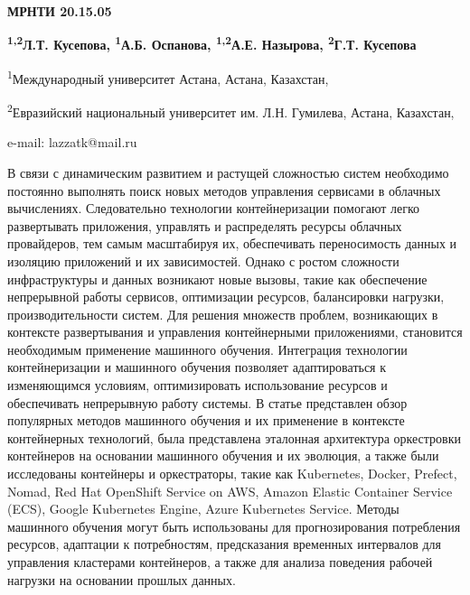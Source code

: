 \newpage
{\bfseries МРНТИ 20.15.05}


\begin{center}
{\bfseries \textsuperscript{1,2}Л.Т. Кусепова, \textsuperscript{1}А.Б.
Оспанова, \textsuperscript{1,2}А.Е. Назырова, \textsuperscript{2}Г.Т.
Кусепова}

\textsuperscript{1}Международный университет Астана, Астана, Казахстан,

\textsuperscript{2}Евразийский национальный университет им. Л.Н.
Гумилева, Астана, Казахстан,

e-mail: lazzatk@mail.ru
\end{center}

В связи с динамическим развитием и растущей сложностью систем необходимо
постоянно выполнять поиск новых методов управления сервисами в облачных
вычислениях. Следовательно технологии контейнеризации помогают легко
развертывать приложения, управлять и распределять ресурсы облачных
провайдеров, тем самым масштабируя их, обеспечивать переносимость данных
и изоляцию приложений и их зависимостей. Однако с ростом сложности
инфраструктуры и данных возникают новые вызовы, такие как обеспечение
непрерывной работы сервисов, оптимизации ресурсов, балансировки
нагрузки, производительности систем. Для решения множеств проблем,
возникающих в контексте развертывания и управления контейнерными
приложениями, становится необходимым применение машинного обучения.
Интеграция технологии контейнеризации и машинного обучения позволяет
адаптироваться к изменяющимся условиям, оптимизировать использование
ресурсов и обеспечивать непрерывную работу системы. В статье представлен
обзор популярных методов машинного обучения и их применение в контексте
контейнерных технологий, была представлена эталонная архитектура
оркестровки контейнеров на основании машинного обучения и их эволюция, а
также были исследованы контейнеры и оркестраторы, такие как Kubernetes,
Docker, Prefect, Nomad, Red Hat OpenShift Service on AWS, Amazon Elastic
Container Service (ECS), Google Kubernetes Engine, Azure Kubernetes
Service. Методы машинного обучения могут быть использованы для
прогнозирования потребления ресурсов, адаптации к потребностям,
предсказания временных интервалов для управления кластерами контейнеров,
а также для анализа поведения рабочей нагрузки на основании прошлых
данных.

